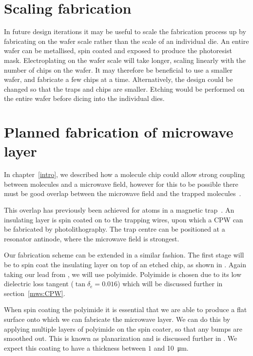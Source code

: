 \section{Scaling fabrication}

In future design iterations it may be useful to scale the fabrication process
up by fabricating on the wafer scale rather than the scale of an individual
die. An entire wafer can be metallised, spin coated and exposed to
produce the photoresist mask. Electroplating on the wafer scale will take
longer, scaling linearly with the number of chips on the wafer. It may therefore
be beneficial to use a smaller wafer, and fabricate a few chips at a time.
Alternatively, the design could be changed so that the traps and chips are
smaller. Etching would be performed on the entire wafer before dicing into the
individual dies.

\section{Planned fabrication of microwave layer}
\label{fab:planned}

In chapter~\ref{intro},
we described how a molecule chip could allow strong coupling between \CaF{}
molecules and a microwave field, however for this to be possible there must be
good overlap between the microwave field and the trapped
molecules~\cite{Andre2006}.

This overlap has previously been achieved for atoms in a magnetic
trap~\cite{Treutlein2008}. An insulating layer is spin coated on to the
trapping wires, upon which a CPW can be fabricated by photolithography. The
trap centre can be positioned at a resonator antinode, where the microwave
field is strongest.

Our fabrication scheme can be extended in a similar fashion. The first stage
will be to spin coat the insulating layer on top of an etched chip, as shown in
. Again taking our lead from
, we will use polyimide. Polyimide is chosen due to
its low dielectric loss tangent ($\tan\delta_e = 0.016$) which will be
discussed further in section~\ref{mws:CPW}.

When spin coating the polyimide it is essential that we are able to produce a
flat surface onto which we can fabricate the microwave layer. We can do this by
applying multiple layers of polyimide on the spin coater, so that any bumps are
smoothed out. This is known as planarization and is discussed further in
. We expect this coating to have a thickness between $1$
and \SI{10}{\micro\meter}.

